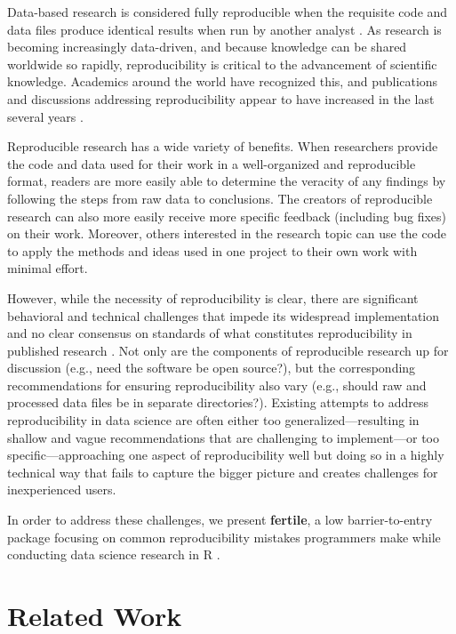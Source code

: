 \documentclass[APA,LATO1COL]{WileyNJD-v2}\usepackage[]{graphicx}\usepackage[]{color}
\newcommand{\pkg}[1]{\textbf{#1}}
\begin{document}
Data-based research is considered fully reproducible when the requisite code and data files produce identical results when run by another analyst \citep{patil2019visual}. As research is becoming increasingly data-driven, and because knowledge can be shared worldwide so rapidly, reproducibility is critical to the advancement of scientific knowledge. Academics around the world have recognized this, and publications and discussions addressing reproducibility appear to have increased in the last several years \citep{eisner-reproducibility, sep-scientific-reproducibility, bioessays-gosselin, engineering-reproducibility, plos-biology}. 

Reproducible research has a wide variety of benefits. When researchers provide the code and data used for their work in a well-organized and reproducible format, readers are more easily able to determine the veracity of any findings by following the steps from raw data to conclusions. The creators of reproducible research can also more easily receive more specific feedback (including bug fixes) on their work. Moreover, others interested in the research topic can use the code to apply the methods and ideas used in one project to their own work with minimal effort.

However, while the necessity of reproducibility is clear, there are significant behavioral and technical challenges that impede its widespread implementation and no clear consensus on standards of what constitutes reproducibility in published research \citep{peng2009bio}. Not only are the components of reproducible research up for discussion (e.g., need the software be open source?), but the corresponding recommendations for ensuring reproducibility also vary (e.g., should raw and processed data files be in separate directories?).
Existing attempts to address reproducibility in data science are often either too generalized---resulting in shallow and vague recommendations that are challenging to implement---or too specific---approaching one aspect of reproducibility well but doing so in a highly technical way that fails to capture the bigger picture and creates challenges for inexperienced users.

In order to address these challenges, we present \pkg{fertile}\citep{R-fertile}, a low barrier-to-entry package focusing on common reproducibility mistakes programmers make while conducting data science research in R \citep{r-software}.


\section{Related Work}\label{sec:lit}
\end{document}
